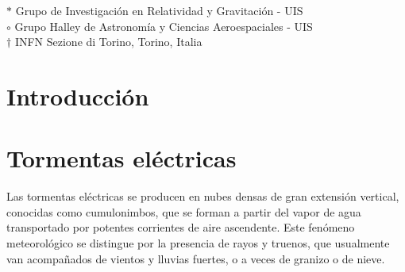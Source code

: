 \documentclass[12pt,oneside,openany,letter]{book}
\begin{document}
\begin{titlepage}



\vfill


\vfill



\vfill

$\ast$  Grupo de Investigaci\'on en Relatividad y Gravitaci\'on - UIS \\
$\circ$ Grupo Halley de Astronom\'ia y Ciencias Aeroespaciales - UIS
\\
$\dagger$ INFN Sezione di Torino, Torino, Italia\\
\vfill

\end{titlepage}

\tableofcontents
\listoffigures


\chapter*{Introducción}\label{introduccion}



\chapter{Tormentas eléctricas}\label{tormentas}
Las tormentas eléctricas se producen en nubes densas de gran extensión vertical, conocidas como cumulonimbos, que se forman a partir del vapor de agua transportado por potentes corrientes de aire ascendente. Este fenómeno meteorológico se distingue por la presencia de rayos y truenos, que usualmente van acompañados de vientos y lluvias fuertes, o a veces de granizo o de nieve. 
\end{document}
